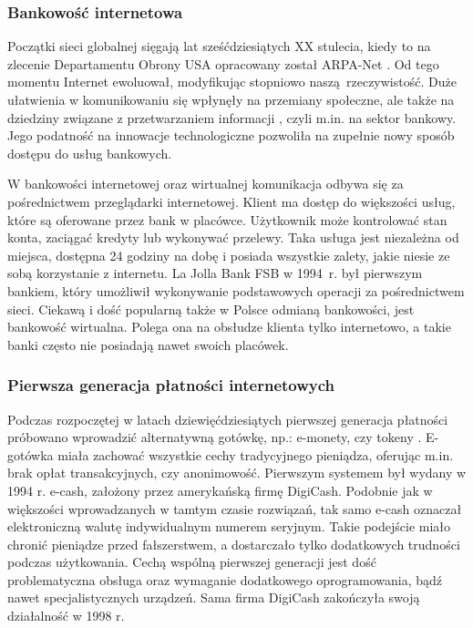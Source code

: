 \subsubsection*{Bankowość internetowa}

Początki sieci globalnej sięgają lat sześćdziesiątych XX stulecia, kiedy to na 
zlecenie Departamentu Obrony USA opracowany został ARPA-Net 
\cite{pieniadz_elektroniczny-analiza}. Od tego momentu Internet ewoluował, 
modyfikując stopniowo naszą rzeczywistość. Duże ułatwienia w komunikowaniu się 
wpłynęły na przemiany społeczne, ale także na dziedziny związane z przetwarzaniem informacji 
\cite{pieniadz_elektroniczny-analiza}, czyli m.in. na sektor bankowy. Jego 
podatność na innowacje technologiczne pozwoliła na zupełnie nowy sposób dostępu 
do usług bankowych.

W bankowości internetowej oraz wirtualnej komunikacja odbywa się za 
pośrednictwem przeglądarki internetowej. Klient ma dostęp do większości usług, które są 
oferowane przez bank w placówce. Użytkownik może kontrolować stan konta, 
zaciągać kredyty lub wykonywać przelewy. Taka usługa jest 
niezależna od miejsca, dostępna 24 godziny na dobę i posiada wszystkie zalety, jakie 
niesie ze sobą korzystanie z internetu. La Jolla Bank FSB w 1994~r. był 
pierwszym bankiem, który umożliwił wykonywanie podstawowych operacji za 
pośrednictwem sieci. Ciekawą i dość popularną także w Polsce odmianą 
bankowości, jest bankowość wirtualna. Polega ona na obsłudze klienta tylko 
internetowo, a takie banki często nie posiadają nawet swoich placówek. 

\subsubsection*{Pierwsza generacja płatności internetowych}

Podczas rozpoczętej w latach dziewięćdziesiątych pierwszej generacja płatności próbowano
wprowadzić alternatywną gotówkę, np.: e-monety, czy tokeny 
\cite{elektroniczne_metody_platnosci}. E-gotówka miała zachować wszystkie cechy 
tradycyjnego pieniądza, oferując m.in. brak opłat transakcyjnych, czy 
anonimowość. Pierwszym systemem był wydany w 1994 r. e-cash, założony przez 
amerykańską firmę DigiCash. Podobnie jak w większości wprowadzanych w tamtym 
czasie rozwiązań, tak samo e-cash oznaczał elektroniczną walutę indywidualnym 
numerem seryjnym. Takie podejście miało chronić pieniądze przed fałszerstwem, a 
dostarczało tylko dodatkowych trudności podczas użytkowania. Cechą wspólną pierwszej generacji jest 
dość problematyczna obsługa oraz wymaganie dodatkowego oprogramowania, bądź 
nawet specjalistycznych urządzeń. Sama firma DigiCash zakończyła swoją działalność w 1998 r.

